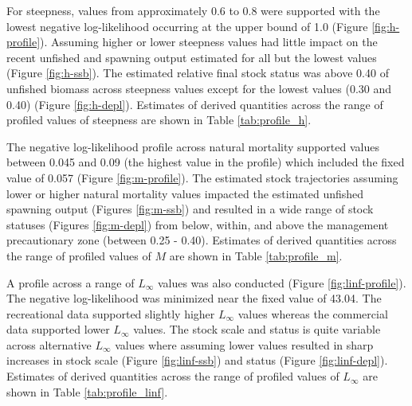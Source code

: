 \documentclass[11pt,
  english,
  a4paper,
]{article}
\begin{document}
\leavevmode\tagmcend\tagstructend\par


For steepness, values from approximately 0.6 to 0.8 were supported with the lowest negative log-likelihood occurring at the upper bound of 1.0 (Figure \ref{fig:h-profile}). Assuming higher or lower steepness values had little impact on the recent unfished and spawning output estimated for all but the lowest values (Figure \ref{fig:h-ssb}). The estimated relative final stock status was above 0.40 of unfished biomass across steepness values except for the lowest values (0.30 and 0.40) (Figure \ref{fig:h-depl}). Estimates of derived quantities across the range of profiled values of steepness are shown in Table \ref{tab:profile_h}.

\leavevmode\tagmcend\tagstructend\par


The negative log-likelihood profile across natural mortality supported values between 0.045 and 0.09 (the highest value in the profile) which included the fixed value of 0.057 (Figure \ref{fig:m-profile}). The estimated stock trajectories assuming lower or higher natural mortality values impacted the estimated unfished spawning output (Figures \ref{fig:m-ssb}) and resulted in a wide range of stock statuses (Figures \ref{fig:m-depl}) from below, within, and above the management precautionary zone (between 0.25 - 0.40). Estimates of derived quantities across the range of profiled values of {\(M\)\leavevmode\tagmcend\tagstructend} are shown in Table \ref{tab:profile_m}.

\leavevmode\tagmcend\tagstructend\par


A profile across a range of {\(L_{\infty}\)\leavevmode\tagmcend\tagstructend} values was also conducted (Figure \ref{fig:linf-profile}). The negative log-likelihood was minimized near the fixed value of 43.04. The recreational data supported slightly higher {\(L_{\infty}\)\leavevmode\tagmcend\tagstructend} values whereas the commercial data supported lower {\(L_{\infty}\)\leavevmode\tagmcend\tagstructend} values. The stock scale and status is quite variable across alternative {\(L_{\infty}\)\leavevmode\tagmcend\tagstructend} values where assuming lower values resulted in sharp increases in stock scale (Figure \ref{fig:linf-ssb}) and status (Figure \ref{fig:linf-depl}). Estimates of derived quantities across the range of profiled values of {\(L_{\infty}\)\leavevmode\tagmcend\tagstructend} are shown in Table \ref{tab:profile_linf}.
\end{document}
